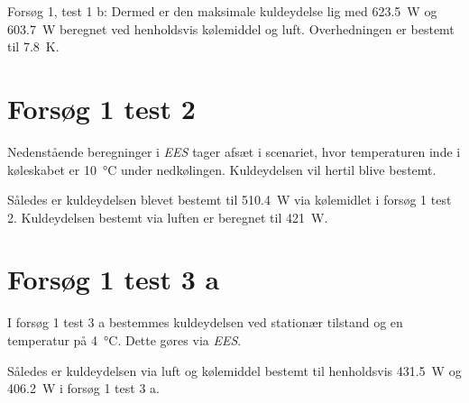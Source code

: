 \documentclass[Hovedrapport.tex]{subfiles}
\begin{document}
\begin{minipage}{1.0\textwidth}

\end{minipage}



Forsøg 1, test 1 b: Dermed er den maksimale kuldeydelse lig med \SI{623,5}{W} og \SI{603,7}{W} beregnet ved henholdsvis kølemiddel og luft. Overhedningen er bestemt til \SI{7,8}{K}.
\newpage
\section{Forsøg 1 test 2}
\label{f1t2}
Nedenstående beregninger i \textit{EES} tager afsæt i scenariet, hvor temperaturen inde i køleskabet er \SI{10}{\celsius} under nedkølingen. Kuldeydelsen vil hertil blive bestemt. 

\begin{minipage}{1.0\textwidth}

\end{minipage}



Således er kuldeydelsen blevet bestemt til \SI{510,4}{W} via kølemidlet i forsøg 1 test 2. Kuldeydelsen bestemt via luften er beregnet til \SI{421}{W}.

\newpage
\section{Forsøg 1 test 3 a}
\label{sec:bil_tryk}
I forsøg 1 test 3 a bestemmes kuldeydelsen ved stationær tilstand og en temperatur på \SI{4}{\celsius}. Dette gøres via \textit{EES}.

\begin{minipage}{1.0\textwidth}

\end{minipage}



Således er kuldeydelsen via luft og kølemiddel bestemt til henholdsvis \SI{431,5}{W} og \SI{406,2}{W} i forsøg 1 test 3 a.
\end{document}
